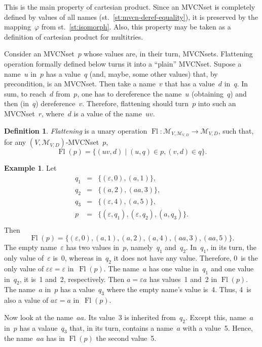 \documentclass{article}
\theoremstyle{definition}
\newtheorem{Df}{Definition}
\newtheorem{Ex}{Example}
\newcommand{\setcharmvcn}{M}
\newcommand{\setsymbol}[3]{\mathcal{#1}_{#2,#3}}
\newcommand{\setmvcn}[2]{\setsymbol{\setcharmvcn}{#1}{#2}}
\newcommand{\flatten}{\operatorname{Fl}}
\begin{document}
This is the main property of cartesian product. Since an MVCNset is
completely defined by values of all names (st.~\ref{st:mvcn-deref-equality}),
it is preserved by the mapping~$\varphi$ from st.~\ref{st:isomorph}. Also, this
property may be taken as a definition of cartesian product for multitries.

Consider an MVCNset~$p$ whose values are, in their turn, MVCNsets.  Flattening
operation formally defined below turns it into a ``plain'' MVCNset.  Supose a
name~$u$ in~$p$ has a value~$q$ (and, maybe, some other values) that, by
precondition, is an MVCNset.  Then take a name~$v$ that has a value~$d$ in~$q$.
In sum, to reach~$d$ from~$p$, one has to dereference the name~$u$
(obtaining~$q$) and then (in~$q$) dereference~$v$. Therefore, flattening should
turn~$p$ into such an MVCNset~$r$, where~$d$ is a value of the name~$uv$.

\begin{Df}\label{df:flatten}
\emph{Flattening} is a unary operation
$\flatten : \setmvcn{V}{\setmvcn{V}{D}} \to\setmvcn{V}{D}$,
such that, for any $(V,\setmvcn{V}{D})$-MVCNset~$p$,
\[
  \flatten(p) = \{ (uv, d) \mid (u, q) \in p, (v, d) \in q \} .
\]
\end{Df}

\begin{Ex}\label{ex:flatten}
Let
\begin{eqnarray*}
  q_1 & = & \{ (\varepsilon, 0), (a, 1) \} ,\\
  q_2 & = & \{ (a, 2), (aa, 3) \} ,\\
  q_3 & = & \{ (\varepsilon, 4), (a, 5) \} ,\\
  p   & = & \{ (\varepsilon, q_1), (\varepsilon, q_2), (a, q_3) \} .\\
\end{eqnarray*}
Then
\[
  \flatten(p) = \{
      (\varepsilon, 0), (a, 1), (a, 2), (a, 4), (aa, 3), (aa, 5)
  \} .
\]
The empty name~$\varepsilon$ has two values in~$p$, namely~$q_1$ and~$q_2$.
In~$q_1$, in its turn, the only value of~$\varepsilon$ is~0, whereas in~$q_2$
it does not have any value. Therefore, 0~is the only value of $\varepsilon
\varepsilon = \varepsilon$ in~$\flatten(p)$.  The name~$a$ has one value in~$q_1$
and one value in~$q_2$, it is~1 and~2, respectively.  Then $a = \varepsilon a$
has values~1 and~2 in $\flatten(p)$.  The name~$a$ in~$p$ has a value~$q_3$
where the empty name's value is~4. Thus, 4~is also a value of $a \varepsilon =
a$ in~$\flatten(p)$.

Now look at the name~$aa$. Its value~3 is inherited from~$q_2$. Except this,
name~$a$ in~$p$ has a valaue~$q_3$ that, in its turn, contains a name~$a$ with
a value~5. Hence, the name~$aa$ has in $\flatten(p)$ the second value~5.
\end{Ex}
\end{document}
